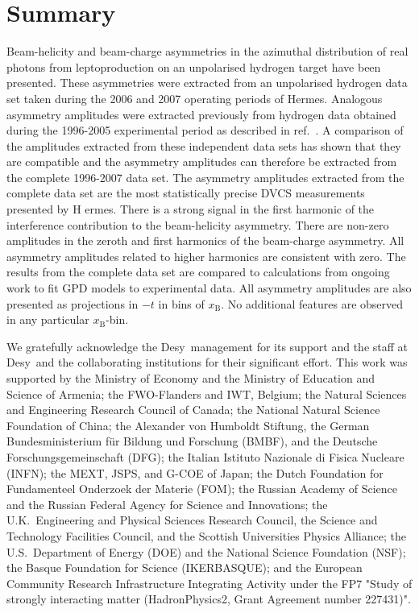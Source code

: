 \documentclass[11pt,a4paper]{article}
\def\desy{{\sc Desy}}
\begin{document}
\section{Summary}
Beam-helicity and beam-charge asymmetries in the azimuthal
distribution of real photons from leptoproduction on an unpolarised
hydrogen target have been presented. These asymmetries were extracted
from an unpolarised hydrogen data set taken during the 2006 and 2007
operating periods of H{\sc ermes}. Analogous asymmetry amplitudes were
extracted previously from hydrogen data obtained during the 1996-2005
experimental period as described in ref.~\cite{Air09}. A comparison of
the amplitudes extracted from these independent data sets has shown
that they are compatible and the asymmetry amplitudes can therefore be
extracted from the complete 1996-2007 data set. The asymmetry
amplitudes extracted from the complete data set are the most
statistically precise DVCS measurements presented by H{\sc
  ermes}. There is a strong signal in the first harmonic of the
interference contribution to the beam-helicity asymmetry. There are
non-zero amplitudes in the zeroth and first harmonics of the
beam-charge asymmetry. All asymmetry amplitudes related to higher
harmonics are consistent with zero. The results from the complete data
set are compared to calculations from ongoing work to fit GPD models to experimental data. All asymmetry amplitudes are also presented as projections in $-t$ in bins of $x_{\textrm{B}}$. No additional features are observed in any particular $x_{\textrm{B}}$-bin.

\acknowledgments
We gratefully acknowledge the \desy\ management for its support and the staff
at \desy\ and the collaborating institutions for their significant effort.
This work was supported by 
the Ministry of Economy and the Ministry of Education and Science of Armenia;
the FWO-Flanders and IWT, Belgium;
the Natural Sciences and Engineering Research Council of Canada;
the National Natural Science Foundation of China;
the Alexander von Humboldt Stiftung,
the German Bundesministerium f\"ur Bildung und Forschung (BMBF), and
the Deutsche Forschungsgemeinschaft (DFG);
the Italian Istituto Nazionale di Fisica Nucleare (INFN);
the MEXT, JSPS, and G-COE of Japan;
the Dutch Foundation for Fundamenteel Onderzoek der Materie (FOM);
the Russian Academy of Science and the Russian Federal Agency for 
Science and Innovations;
the U.K.~Engineering and Physical Sciences Research Council, 
the Science and Technology Facilities Council,
and the Scottish Universities Physics Alliance;
the U.S.~Department of Energy (DOE) and the National Science Foundation (NSF);
the Basque Foundation for Science (IKERBASQUE);
and the European Community Research Infrastructure Integrating Activity
under the FP7 "Study of strongly interacting matter (HadronPhysics2, Grant
Agreement number 227431)".
\end{document}
